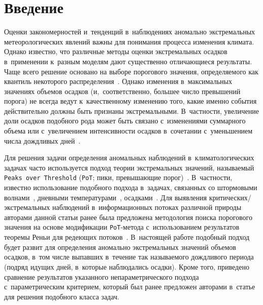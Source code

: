 
  
\vspace*{-4pt}



\thispagestyle{headings}

\begin{multicols}{2}

\label{st\stat}

\section{Введение}

Оценки закономерностей и~тенденций в~наблюдениях аномально
экстремальных метеорологических явлений важны для понимания
процесса изменения климата. Однако известно, что различные методы
оценки экстремальных осадков в~применении к~разным моделям дают
существенно отличающиеся результаты. Чаще всего решение основано
на выборе порогового значения, определяемого как квантиль 
некоторого распределения~\cite{Groisman1999}. Однако изменения 
в~максимальных значениях объемов осадков (и,~соответственно, большее число 
превышений порога) не всегда
ведут к~качественному изменению того, какие именно события
действительно должны быть признаны экстремальными. В~частности,
увеличение доли осадков подобного рода может быть связано 
с~изменениями суммарного объема или с~увеличением интенсивности
осадков в~сочетании с~уменьшением числа дождливых дней~\cite{Zolina2008}.

Для решения задачи определения аномальных наблюдений в~климатологических
 задачах часто используется подход теории экстремальных значений, 
 называемый \verb"Peaks over Threshold" (\verb"PoT"; пики, превышающие 
 порог)~\cite{Leadbetter1991}. В~частности, известно использование подобного 
 подхода в~задачах, связанных со штормовыми волнами~\cite{Mendez2006}, 
 дневными температурами~\cite{Kysely2010}, 
 осадками~\cite{Begueria2006,Begueria2011,Roth2012}. 
 Для выявления кри\-ти\-че\-ских/экстре\-маль\-ных наблюдений в~информационных 
 потоках различной природы авторами данной статьи ранее была предложена 
 методология поиска порогового значения на основе модификации \verb"PoT"-ме\-то\-да 
 с~использованием результатов теоремы Реньи для редеющих потоков~\cite{Gorshenin2016a}. 
 В~настоящей работе подобный подход будет развит для определения аномально 
 экстремальных значений объемов осадков, в~том числе выпавших в~течение так 
 называемого дождливого периода (подряд идущих дней, в~которые наблюдались осадки). 
 Кроме того, приведено сравнение результатов указанного непараметрического 
 подхода с~параметрическим критерием, который был ранее предложен авторами 
 в~статье~\cite{Gorshenin2018as} для решения подобного класса задач.
 

\end{multicols}
